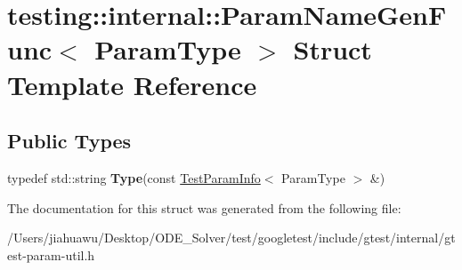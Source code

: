 \hypertarget{structtesting_1_1internal_1_1_param_name_gen_func}{}\section{testing\+:\+:internal\+:\+:Param\+Name\+Gen\+Func$<$ Param\+Type $>$ Struct Template Reference}
\label{structtesting_1_1internal_1_1_param_name_gen_func}
\subsection*{Public Types}
\begin{DoxyCompactItemize}
\item 
\mbox{\label{structtesting_1_1internal_1_1_param_name_gen_func_adf1ce5df22a930ae715082862d72590f}} 
typedef std\+::string {\bfseries Type}(const \mbox{\hyperlink{structtesting_1_1_test_param_info}{Test\+Param\+Info}}$<$ Param\+Type $>$ \&)
\end{DoxyCompactItemize}


The documentation for this struct was generated from the following file\+:\begin{DoxyCompactItemize}
\item 
/\+Users/jiahuawu/\+Desktop/\+O\+D\+E\+\_\+\+Solver/test/googletest/include/gtest/internal/gtest-\/param-\/util.\+h\end{DoxyCompactItemize}
